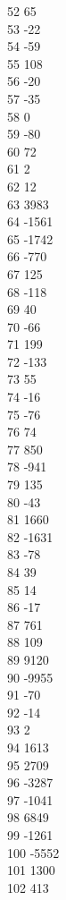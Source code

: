 { 52	65 \\
 53	-22 \\
 54	-59 \\
 55	108 \\
 56	-20 \\
 57	-35 \\
 58	0 \\
 59	-80 \\
 60	72 \\
 61	2 \\
 62	12 \\
 63	3983 \\
 64	-1561 \\
 65	-1742 \\
 66	-770 \\
 67	125 \\
 68	-118 \\
 69	40 \\
 70	-66 \\
 71	199 \\
 72	-133 \\
 73	55 \\
 74	-16 \\
 75	-76 \\
 76	74 \\
 77	850 \\
 78	-941 \\
 79	135 \\
 80	-43 \\
 81	1660 \\
 82	-1631 \\
 83	-78 \\
 84	39 \\
 85	14 \\
 86	-17 \\
 87	761 \\
 88	109 \\
 89	9120 \\
 90	-9955 \\
 91	-70 \\
 92	-14 \\
 93	2 \\
 94	1613 \\
 95	2709 \\
 96	-3287 \\
 97	-1041 \\
 98	6849 \\
 99	-1261 \\
 100	-5552 \\
 101	1300 \\
 102	413 \\
}
